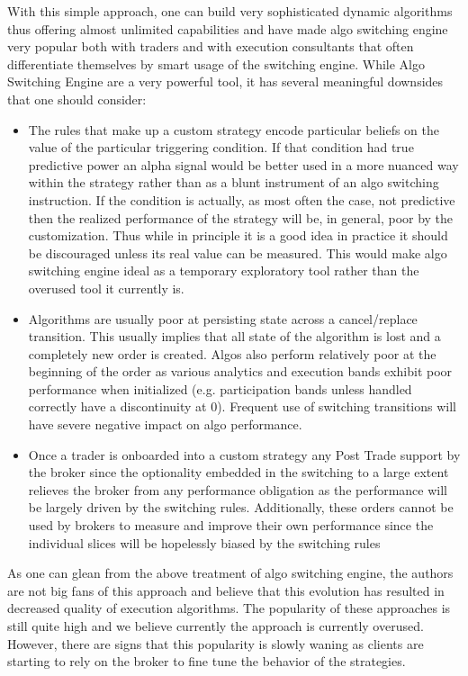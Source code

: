 With this simple approach, one can build very sophisticated dynamic algorithms thus offering almost unlimited capabilities and have made algo switching engine very popular both with traders and with execution consultants that often differentiate themselves by smart usage of the switching engine. While Algo Switching Engine are a very powerful tool, it has several meaningful downsides that one should consider:
\begin{itemize}
\item The rules that make up a custom strategy encode particular beliefs on the value of the particular triggering condition. If that condition had true predictive power an alpha signal would be better used in a more nuanced way within the strategy rather than as a blunt instrument of an algo switching instruction. If the condition is actually, as most often the case, not predictive then the realized performance of the strategy will be, in general, poor by the customization. Thus while in principle it is a good idea in practice it should be discouraged unless its real value can be measured. This would make algo switching engine ideal as a temporary exploratory tool rather than the overused tool it currently is.
\item  Algorithms are usually poor at persisting state across a cancel/replace transition. This usually implies that all state of the algorithm is lost and a completely new order is created. Algos also perform relatively poor at the beginning of the order as various analytics and execution bands exhibit poor performance when initialized (e.g. participation bands unless handled correctly have a discontinuity at 0). Frequent use of switching transitions will have severe negative impact on algo performance.
\item Once a trader is onboarded into a custom strategy any Post Trade support by the broker since the optionality embedded in the switching to a large extent relieves the broker from any performance obligation as the performance will be largely driven by the switching rules. Additionally, these orders cannot be used by brokers to measure and improve their own performance since the individual slices will be hopelessly biased by the switching rules
\end{itemize}


As one can glean from the above treatment of algo switching engine, the authors are not big fans of this approach and believe that this evolution has resulted in decreased quality of execution algorithms. The popularity of these approaches is still quite high and we believe currently the approach is currently overused. However, there are signs that this popularity is slowly waning as clients are starting to rely on the broker to fine tune the behavior of the strategies. \\


